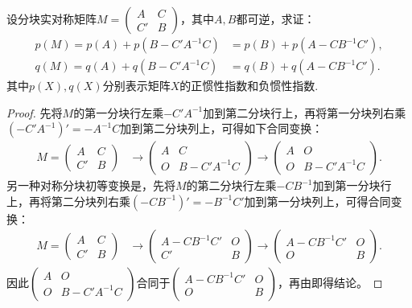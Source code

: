 \documentclass[../../main.tex]{subfiles}
\begin{document}
\begin{proposition}[正负惯性指数的降阶公式]\label{proposition:正负惯性指数的降阶公式}
设分块实对称矩阵\(M = \begin{pmatrix}
A & C \\
C' & B
\end{pmatrix}\)，其中\(A,B\)都可逆，求证：
\begin{align*}
p(M)=p(A)+p(B - C'A^{-1}C)&=p(B)+p(A - CB^{-1}C'),\\
q(M)=q(A)+q(B - C'A^{-1}C)&=q(B)+q(A - CB^{-1}C').
\end{align*}
其中$p(X),q(X)$分别表示矩阵$X$的正惯性指数和负惯性指数.
\end{proposition}
\begin{proof}
先将\(M\)的第一分块行左乘\(-C'A^{-1}\)加到第二分块行上，再将第一分块列右乘\((-C'A^{-1})'=-A^{-1}C\)加到第二分块列上，可得如下合同变换：
\begin{align*}
M = \begin{pmatrix}
A & C \\
C' & B
\end{pmatrix}
&\rightarrow\begin{pmatrix}
A & C \\
O & B - C'A^{-1}C
\end{pmatrix}
\rightarrow\begin{pmatrix}
A & O \\
O & B - C'A^{-1}C
\end{pmatrix}.
\end{align*}
另一种对称分块初等变换是，先将\(M\)的第二分块行左乘\(-CB^{-1}\)加到第一分块行上，再将第二分块列右乘\((-CB^{-1})'=-B^{-1}C'\)加到第一分块列上，可得合同变换：
\begin{align*}
M = \begin{pmatrix}
A & C \\
C' & B
\end{pmatrix}
&\rightarrow\begin{pmatrix}
A - CB^{-1}C' & O \\
C' & B
\end{pmatrix}
\rightarrow\begin{pmatrix}
A - CB^{-1}C' & O \\
O & B
\end{pmatrix}.
\end{align*}
因此\(\begin{pmatrix}
A & O \\
O & B - C'A^{-1}C
\end{pmatrix}\)合同于\(\begin{pmatrix}
A - CB^{-1}C' & O \\
O & B
\end{pmatrix}\)，再由即得结论。
\end{proof} 
\end{document}
